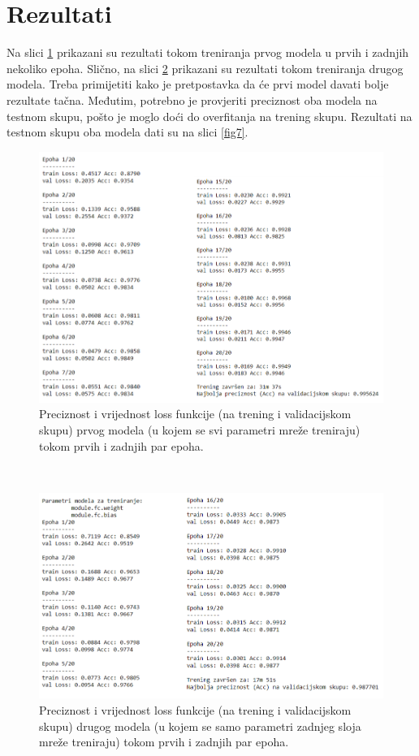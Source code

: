 \documentclass[conference]{IEEEtran}
\begin{document}
\section{Rezultati}

Na slici \ref{fig5} prikazani su rezultati tokom treniranja prvog modela u prvih i zadnjih nekoliko epoha. Slično, na slici \ref{fig6} prikazani su rezultati tokom treniranja drugog modela. Treba primijetiti kako je pretpostavka da će prvi model davati bolje rezultate tačna. Međutim, potrebno je provjeriti preciznost oba modela na testnom skupu, pošto je moglo doći do overfitanja na trening skupu. Rezultati na testnom skupu oba modela dati su na slici \ref{fig7}. 

\begin{figure}[htbp]
\centerline{\includegraphics[width=\columnwidth]{fig5.png}}
\caption{Preciznost i vrijednost loss funkcije (na trening i validacijskom skupu) prvog modela (u kojem se svi parametri mreže treniraju) tokom prvih i zadnjih par epoha.}
\label{fig5}
\end{figure}
\\

\begin{figure}[htbp]
\centerline{\includegraphics[width=\columnwidth]{fig6.png}}
\caption{Preciznost i vrijednost loss funkcije (na trening i validacijskom skupu) drugog modela (u kojem se samo parametri zadnjeg sloja mreže treniraju) tokom prvih i zadnjih par epoha.}
\label{fig6}
\end{figure}
\\
\end{document}
